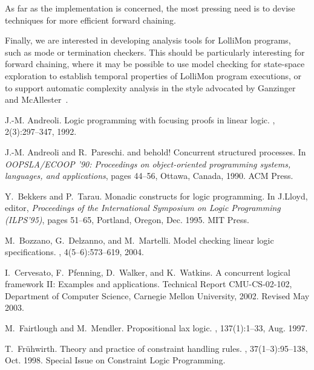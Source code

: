 \documentclass{sig-alt}
\begin{document}
As far as the implementation is concerned, the most pressing need is to
devise techniques for more efficient forward chaining.

Finally, we are interested in developing analysis tools for LolliMon
programs, such as mode or termination checkers.  This should be
particularly interesting for forward chaining, where it may be possible
to use model checking for state-space exploration to establish temporal
properties of LolliMon program executions, or to support automatic
complexity analysis in the style advocated by Ganzinger and
McAllester~\cite{Ganzinger01ijcar}.

\ignore{


}

\begin{thebibliography}{50}
\vspace*{0.5mm}
\scriptsize

J.-M. Andreoli.
\newblock Logic programming with focusing proofs in linear logic.
, 2(3):297--347, 1992.

J.-M. Andreoli and R.~Pareschi.
 and behold! {C}oncurrent structured processes.
\newblock In {\em {OOPSLA/ECOOP} '90: {P}roceedings on object-oriented
  programming systems, languages, and applications}, pages 44--56, Ottawa,
  Canada, 1990. ACM Press.

Y.~Bekkers and P.~Tarau.
\newblock Monadic constructs for logic programming.
\newblock In J.Lloyd, editor, {\em Proceedings of the International Symposium
  on Logic Programming (ILPS'95)}, pages 51--65, Portland, Oregon, Dec. 1995.
  MIT Press.

M.~Bozzano, G.~Delzanno, and M.~Martelli.
\newblock Model checking linear logic specifications.
, 4(5--6):573--619,
  2004.

I.~Cervesato, F.~Pfenning, D.~Walker, and K.~Watkins.
\newblock A concurrent logical framework {II}: Examples and applications.
\newblock Technical Report CMU-CS-02-102, Department of Computer Science,
  Carnegie Mellon University, 2002.
\newblock Revised May 2003.

M.~Fairtlough and M.~Mendler.
\newblock Propositional lax logic.
, 137(1):1--33, Aug. 1997.

T.~Fr{\"u}hwirth.
\newblock Theory and practice of constraint handling rules.
, 37(1--3):95--138, Oct. 1998.
\newblock Special Issue on Constraint Logic Programming.


\end{thebibliography}
\end{document}
